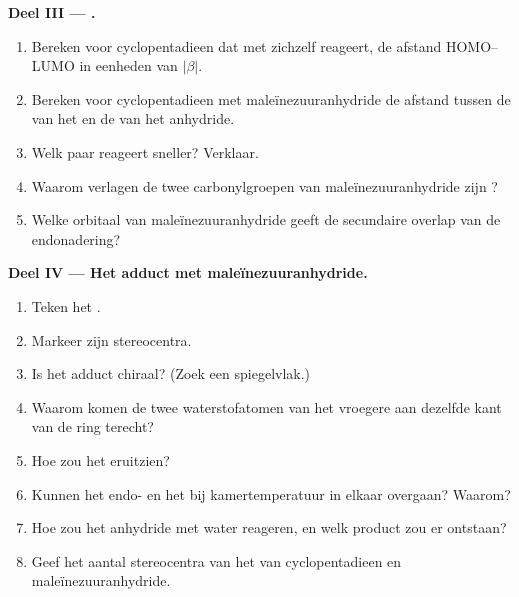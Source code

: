 \begin{problem}
\medskip
\noindent\textbf{Deel III --- .}
\begin{enumerate}[resume]
  \item Bereken voor cyclopentadieen dat met zichzelf reageert, de afstand HOMO--LUMO in eenheden van
        $|\beta|$.
  \item Bereken voor cyclopentadieen met maleïnezuuranhydride de afstand tussen de  van het
         en de  van het anhydride.
  \item Welk paar reageert sneller? Verklaar.
  \item Waarom verlagen de twee carbonylgroepen van maleïnezuuranhydride zijn ?
  \item Welke orbitaal van maleïnezuuranhydride geeft de secundaire overlap van de
        endonadering?
\end{enumerate}

\medskip
\noindent\textbf{Deel IV --- Het adduct met maleïnezuuranhydride.}
\begin{enumerate}[resume]
  \item Teken het .
  \item Markeer zijn stereocentra.
  \item Is het adduct chiraal? (Zoek een spiegelvlak.)
  \item Waarom komen de twee waterstofatomen van het vroegere  aan dezelfde kant van de
        ring terecht?
  \item Hoe zou het  eruitzien?
  \item Kunnen het endo- en het  bij kamertemperatuur in elkaar overgaan? Waarom?
  \item Hoe zou het anhydride met water reageren, en welk product zou er ontstaan?
  \item Geef het aantal stereocentra van het  van cyclopentadieen en
        maleïnezuuranhydride.
\end{enumerate}
\end{problem}

